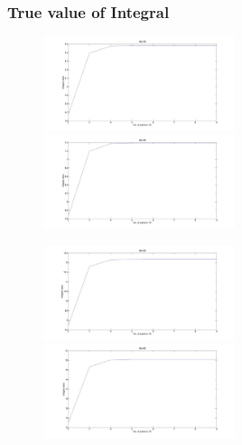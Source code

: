 \documentclass[11pt]{beamer}
\begin{document}
\begin{frame}
\frametitle{True value of Integral}
   \begin{figure}[thpb]
      \centering
      \includegraphics[width=0.5\textwidth]{3dGH_for_exp.jpg}
      \includegraphics[width=0.5\textwidth]{4dGH_for_exp.jpg}
      \label{fig:23d4m1}
   \end{figure} 

   \begin{figure}[thpb]
      \centering
      \includegraphics[width=0.5\textwidth]{5dGH_for_exp.jpg}
      \includegraphics[width=0.5\textwidth]{6dGH_for_exp.jpg}
   \end{figure} 
\end{frame}
\end{document}
